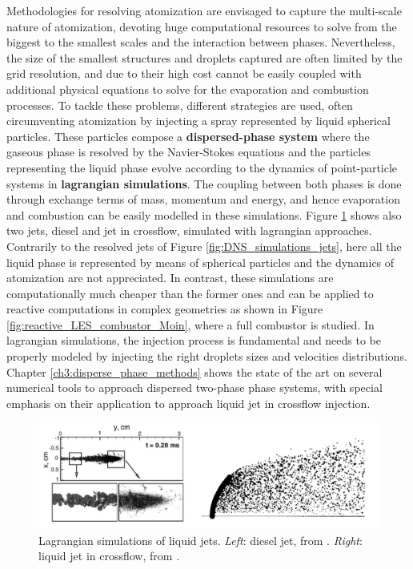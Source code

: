 Methodologies for resolving atomization are envisaged to capture the multi-scale nature of atomization, devoting huge computational resources to solve from the biggest to the smallest scales and the interaction between phases. Nevertheless, the size of the smallest structures and droplets captured are often limited by the grid resolution, and due to their high cost cannot be easily coupled with additional physical equations to solve for the evaporation and combustion processes. To tackle these problems, different strategies are used, often circumventing atomization by injecting a spray represented by liquid spherical particles. These particles compose a \textbf{dispersed-phase system} where the gaseous phase is resolved by the Navier-Stokes equations and the particles representing the liquid phase evolve according to the dynamics of point-particle systems in \textbf{lagrangian simulations}. The coupling between both phases is done through exchange terms of mass, momentum and energy, and hence evaporation and combustion can be easily modelled in these simulations. Figure \ref{fig:lagrangian_simulations_jets} shows also two jets, diesel and jet in crossflow, simulated with lagrangian approaches. Contrarily to the resolved jets of Figure \ref{fig:DNS_simulations_jets}, here all the liquid phase is represented by means of spherical particles and the dynamics of atomization are not appreciated. In contrast, these simulations are computationally much cheaper than the former ones and can be applied to reactive computations in complex geometries as shown in Figure \ref{fig:reactive_LES_combustor_Moin}, where a full combustor is studied. In lagrangian simulations, the injection process is fundamental and needs to be properly modeled by injecting the right droplets sizes and velocities distributions. Chapter \ref{ch3:disperse_phase_methods} shows the state of the art on several numerical tools to approach dispersed two-phase phase systems, with special emphasis on their application to approach liquid jet in crossflow injection.

\begin{figure}[h!]
	\centering
   \includegraphics[scale=0.5]{./part0_intro/jets_lagrangian_simulations}
	\caption[Lagrangian simulations of liquid jets.]{Lagrangian simulations of liquid jets. \textsl{Left}: diesel jet, from  . \textsl{Right}: liquid jet in crossflow, from .}
	\label{fig:lagrangian_simulations_jets}
\end{figure}

